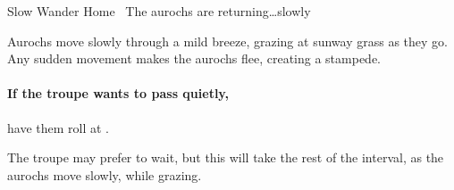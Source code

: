 {Slow Wander Home}%
{~The aurochs are returning\ldots slowly}%

Aurochs move slowly through a mild breeze, grazing at \gls{sunway} grass as they go.
Any sudden movement makes the aurochs flee, creating a stampede.

\paragraph{If the troupe wants to pass quietly,}
have them roll  at \tn[8].

The troupe may prefer to wait, but this will take the rest of the \gls{interval}, as the aurochs move slowly, while grazing.

